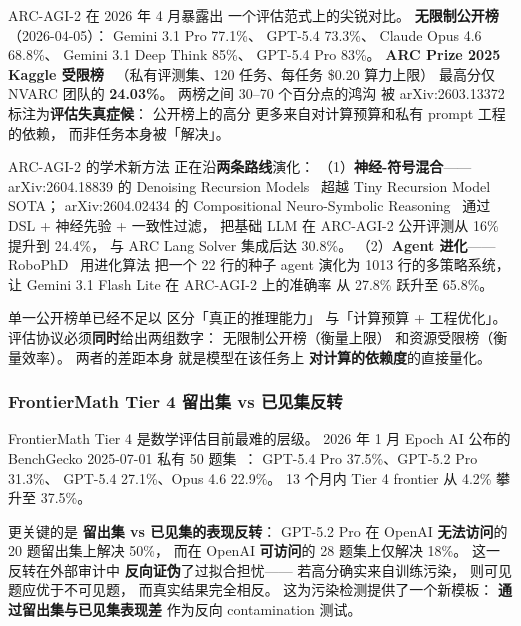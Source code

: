 ARC-AGI-2 在 2026 年 4 月暴露出
一个评估范式上的尖锐对比。
\textbf{无限制公开榜}（2026-04-05）：
Gemini 3.1 Pro 77.1\%、
GPT-5.4 73.3\%、
Claude Opus 4.6 68.8\%、
Gemini 3.1 Deep Think 85\%、
GPT-5.4 Pro 83\%。
\textbf{ARC Prize 2025 Kaggle 受限榜}~\cite{arcprize2025kaggle}
（私有评测集、120 任务、每任务 \$0.20 算力上限）
最高分仅 NVARC 团队的 \textbf{24.03\%}。
两榜之间 30--70 个百分点的鸿沟
被 arXiv:2603.13372~\cite{arcfailure2603}
标注为\textbf{评估失真症候}：
公开榜上的高分
更多来自对计算预算和私有 prompt 工程的依赖，
而非任务本身被「解决」。

ARC-AGI-2 的学术新方法
正在沿\textbf{两条路线}演化：
（1）\textbf{神经-符号混合}——
arXiv:2604.18839 的 Denoising Recursion Models~\cite{denoisingrec2604}
超越 Tiny Recursion Model SOTA；
arXiv:2604.02434 的 Compositional Neuro-Symbolic Reasoning~\cite{compneurosym2604}
通过 DSL + 神经先验 + 一致性过滤，
把基础 LLM 在 ARC-AGI-2 公开评测从 16\% 提升到 24.4\%，
与 ARC Lang Solver 集成后达 30.8\%。
（2）\textbf{Agent 进化}——
RoboPhD~\cite{robophd2604} 用进化算法
把一个 22 行的种子 agent
演化为 1013 行的多策略系统，
让 Gemini 3.1 Flash Lite 在 ARC-AGI-2 上的准确率
从 27.8\% 跃升至 65.8\%。

\begin{keybox}
单一公开榜单已经不足以
区分「真正的推理能力」
与「计算预算 + 工程优化」。
评估协议必须\textbf{同时}给出两组数字：
无限制公开榜（衡量上限）
和资源受限榜（衡量效率）。
两者的差距本身
就是模型在该任务上
\textbf{对计算的依赖度}的直接量化。
\end{keybox}

\subsubsection{FrontierMath Tier 4 留出集 vs 已见集反转}

FrontierMath Tier 4
是数学评估目前最难的层级。
2026 年 1 月 Epoch AI 公布的 BenchGecko
2025-07-01 私有 50 题集~\cite{benchgecko2026t4}：
GPT-5.4 Pro 37.5\%、GPT-5.2 Pro 31.3\%、
GPT-5.4 27.1\%、Opus 4.6 22.9\%。
13 个月内 Tier 4 frontier 从 4.2\% 攀升至 37.5\%。

更关键的是
\textbf{留出集 vs 已见集的表现反转}：
GPT-5.2 Pro 在 OpenAI \textbf{无法访问}的
20 题留出集上解决 50\%，
而在 OpenAI \textbf{可访问}的 28 题集上仅解决 18\%。
这一反转在外部审计中
\textbf{反向证伪}了过拟合担忧——
若高分确实来自训练污染，
则可见题应优于不可见题，
而真实结果完全相反。
这为污染检测提供了一个新模板：
\textbf{通过留出集与已见集表现差}
作为反向 contamination 测试。

